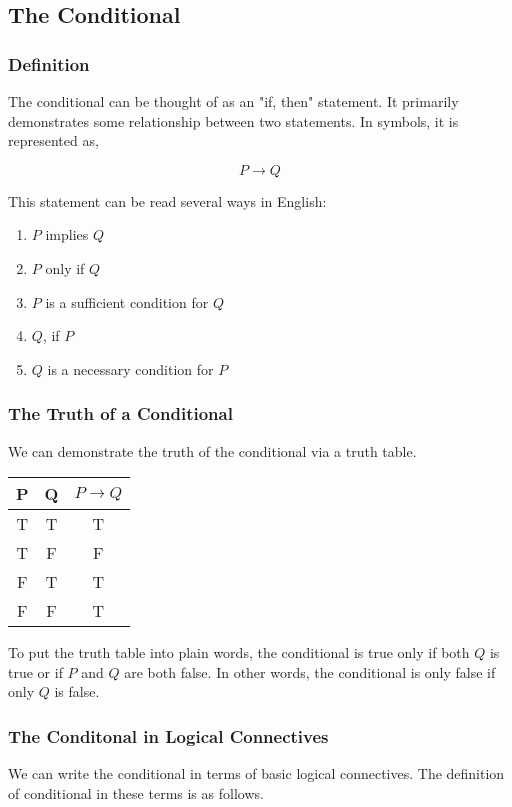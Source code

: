 \documentclass{article}
\begin{document}
\subsection{The Conditional}
\subsubsection{Definition}
The conditional can be thought of as an "if, then" statement. It 
primarily demonstrates some relationship between two statements.
In symbols, it is represented as,

\[ P \rightarrow Q \]

\noindent This statement can be read several ways in English:
\begin{enumerate}
    \item $P$ implies $Q$
    \item $P$ only if $Q$
    \item $P$ is a sufficient condition for $Q$
    \item $Q$, if $P$
    \item $Q$ is a necessary condition for $P$
\end{enumerate}

\subsubsection{The Truth of a Conditional}
We can demonstrate the truth of the conditional via a truth table.
\begin{center}
    \begin{tabular}{c | c | c}
        P & Q & $P \rightarrow Q$ \\
        \hline
        T & T & T \\
        T & F & F \\
        F & T & T \\
        F & F & T \\
    \end{tabular}
\end{center}

To put the truth table into plain words, the conditional is
true only if both $Q$ is true or if $P$ and $Q$ are both false. In other
words, the conditional is only false if only $Q$ is false.

\subsubsection{The Conditonal in Logical Connectives}
We can write the conditional in terms of basic logical connectives.
The definition of conditional in these terms is as follows.
\end{document}
